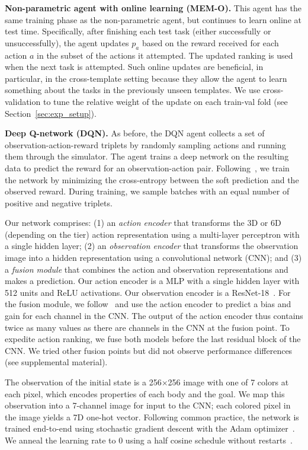 \documentclass{article}
\begin{document}
\noindent\textbf{Non-parametric agent with online learning (MEM-O).} This agent has the same training phase as the non-parametric agent, but continues to learn online at test time. Specifically, after finishing each test task (either successfully or unsuccessfully), the agent updates $p_a$ based on the reward received for each action $a$ in the subset of the actions it attempted. The updated ranking is used when the next task is attempted. Such online updates are beneficial, in particular, in the cross-template setting because they allow the agent to learn something about the tasks in the previously unseen templates. We use cross-validation to tune the relative weight of the  update on each train-val fold (see Section~\ref{sec:exp_setup}).

\noindent\textbf{Deep Q-network (DQN).} As before, the DQN agent collects a set of observation-action-reward triplets by randomly sampling actions and running them through the simulator.
The agent trains a deep network on the resulting data to predict the reward for an observation-action pair.
Following~\cite{bellemare2017distributional}, we train the network by minimizing the cross-entropy between the soft prediction and the observed reward.
During training, we sample batches with an equal number of positive and negative triplets.

Our network comprises: (1) an \emph{action encoder} that transforms the 3D or 6D (depending on the tier) action representation using a multi-layer perceptron with a single hidden layer; (2) an \emph{observation encoder} that transforms the observation image into a hidden representation using a convolutional network (CNN); and (3) a \emph{fusion module} that combines the action and observation representations and makes a prediction. Our action encoder is a MLP with a single hidden layer with 512 units and ReLU activations. Our observation encoder is a ResNet-18~\cite{he2016deep}. For the fusion module, we follow~\cite{perez2018film} and use the action encoder to predict a bias and gain for each channel in the CNN. The output of the action encoder thus contains twice as many values as there are channels in the CNN at the fusion point. To expedite action ranking, we fuse both models before the last residual block of the CNN. We tried other fusion points but did not observe performance differences (see supplemental material).

The observation of the initial state is a 256$\times$256 image with one of 7 colors at each pixel, which encodes properties of each body and the goal. We map this observation into a 7-channel image for input to the CNN; each colored pixel in the image yields a 7D one-hot vector. Following common practice, the network is trained end-to-end using stochastic gradient descent with the Adam optimizer~\cite{kingma2014adam}. We anneal the learning rate to 0 using a half cosine schedule without restarts~\cite{loshchilov2016sgdr}.
\end{document}
